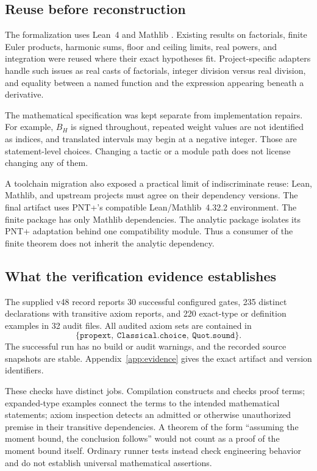 \documentclass[11pt,a4paper]{article}
\theoremstyle{definition}
\theoremstyle{remark}
\numberwithin{equation}{section}
\begin{document}
\subsection{Reuse before reconstruction}
The formalization uses Lean~4 and Mathlib \citep{Lean4,Mathlib2020,MathlibPin}.
Existing results on factorials, finite Euler products, harmonic sums, floor and
ceiling limits, real powers, and integration were reused where their exact
hypotheses fit. Project-specific adapters handle such issues as real casts of
factorials, integer division versus real division, and equality between a named
function and the expression appearing beneath a derivative.

The mathematical specification was kept separate from implementation repairs.
For example, $B_H$ is signed throughout, repeated weight values are not
identified as indices, and translated intervals may begin at a negative
integer. Those are statement-level choices. Changing a tactic or a module path
does not license changing any of them.

A toolchain migration also exposed a practical limit of indiscriminate reuse:
Lean, Mathlib, and upstream projects must agree on their dependency versions.
The final artifact uses PNT+'s compatible Lean/Mathlib~4.32.2 environment.
The finite package has only Mathlib dependencies. The analytic package isolates
its PNT+ adaptation behind one compatibility module. Thus a consumer of the
finite theorem does not inherit the analytic dependency.

\subsection{What the verification evidence establishes}\label{sec:trust}
The supplied v48 record \citep{SieveArtifact} reports 30 successful configured
gates, 235 distinct declarations with transitive axiom reports, and 220
exact-type or definition examples in 32 audit files. All audited axiom sets are
contained in
\begin{equation}\label{eq:axioms}
 \{\texttt{propext},\ \texttt{Classical.choice},\ \texttt{Quot.sound}\}.
\end{equation}
The successful run has no build or audit warnings, and the recorded source
snapshots are stable. Appendix~\ref{app:evidence} gives the exact artifact and
version identifiers.

These checks have distinct jobs. Compilation constructs and checks proof terms;
expanded-type examples connect the terms to the intended mathematical
statements; axiom inspection detects an admitted or otherwise unauthorized
premise in their transitive dependencies. A theorem of the form
``assuming the moment bound, the conclusion follows'' would not count as a
proof of the moment bound itself. Ordinary runner tests instead check
engineering behavior and do not establish universal mathematical assertions.
\end{document}
